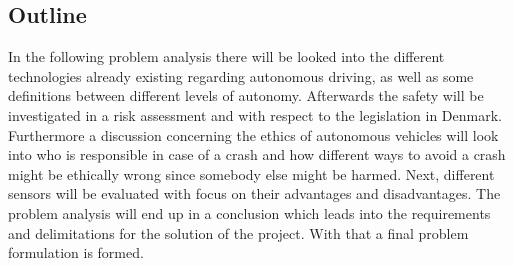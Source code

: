 \subsection{Outline}
In the following problem analysis there will be looked into the different technologies already existing regarding autonomous driving, as well as some definitions between different levels of autonomy. Afterwards the safety will be investigated in a risk assessment and with respect to the legislation in Denmark. Furthermore a discussion concerning the ethics of autonomous vehicles will look into who is responsible in case of a crash and how different ways to avoid a crash might be ethically wrong since somebody else might be harmed. Next, different sensors will be evaluated with focus on their advantages and disadvantages. The problem analysis will end up in a conclusion which leads into the requirements and delimitations for the solution of the project. With that a final problem formulation is formed.
\color{black}